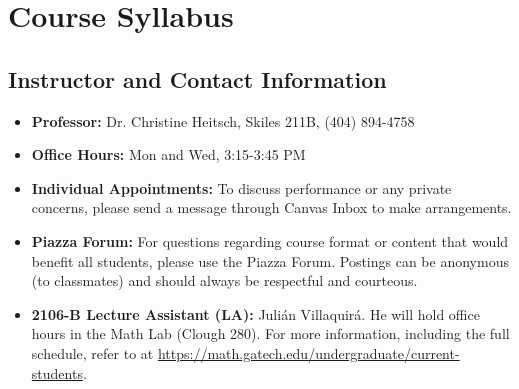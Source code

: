 \section*{Course Syllabus}

\subsection*{Instructor and Contact Information}
\begin{itemize}[labelwidth=]
    \item \textbf{Professor:} Dr. Christine Heitsch, Skiles 211B, (404) 894-4758
    \item \textbf{Office Hours:} Mon and Wed, 3:15-3:45 PM
    \item \textbf{Individual Appointments:} To discuss performance or any private concerns, please send a message through Canvas Inbox to make arrangements.
    \item \textbf{Piazza Forum:} For questions regarding course format or content that would benefit all students, please use the Piazza Forum. Postings can be anonymous (to classmates) and should always be respectful and courteous.
    \item \textbf{2106-B Lecture Assistant (LA):} Juli\'an Villaquir\'a. He will hold office hours in the Math Lab (Clough 280). For more information, including the full schedule, refer to  at \href{https://math.gatech.edu/undergraduate/current-students}{https://math.gatech.edu/undergraduate/current-students}.
\end{itemize}

